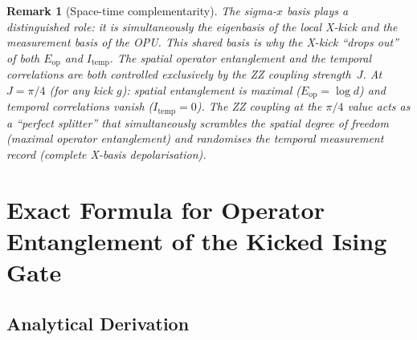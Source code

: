 \documentclass[12pt,a4paper]{article}
\newtheorem{remark}[theorem]{Remark}
\begin{document}
\begin{remark}[Space-time complementarity]\label{rmk:spacetime}
The sigma-$x$ basis plays a distinguished role: it is simultaneously the
eigenbasis of the local X-kick and the measurement basis of the OPU.
This shared basis is why the X-kick ``drops out'' of both $E_\mathrm{op}$ and
$I_\mathrm{temp}$.
The spatial operator entanglement and the temporal correlations are
both controlled exclusively by the ZZ coupling strength~$J$.
At $J=\pi/4$ (for any kick $g$): spatial entanglement is maximal
($E_\mathrm{op}=\log d$) and temporal correlations vanish ($I_\mathrm{temp}=0$).
The ZZ coupling at the $\pi/4$ value acts as a ``perfect splitter'' that
simultaneously scrambles the spatial degree of freedom (maximal operator
entanglement) and randomises the temporal measurement record (complete
X-basis depolarisation).
\end{remark}

\section{Exact Formula for Operator Entanglement of the Kicked Ising Gate}
\label{sec:Eop_formula}

\subsection{Analytical Derivation}
\end{document}
